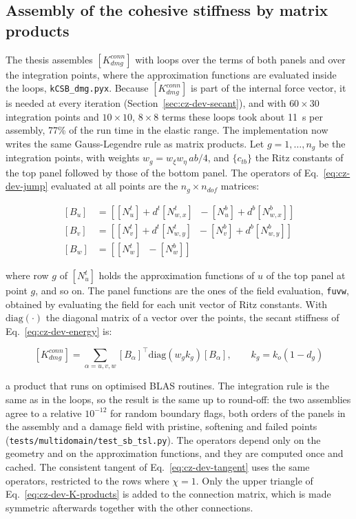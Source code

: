 \subsection{Assembly of the cohesive stiffness by matrix products}\label{sec:cz-dev-assembly}

The thesis assembles $[K^{conn}_{dmg}]$ with loops over the terms of both panels and over the integration points, where the approximation functions are evaluated inside the loops, \texttt{kCSB\_dmg.pyx}. Because $[K^{conn}_{dmg}]$ is part of the internal force vector, it is needed at every iteration (Section~\ref{sec:cz-dev-secant}), and with $60 \times 30$ integration points and $10 \times 10$, $8 \times 8$ terms these loops took about 11~s per assembly, 77\% of the run time in the elastic range. The implementation now writes the same Gauss-Legendre rule as matrix products. Let $g = 1, \dots, n_g$ be the integration points, with weights $w_g = w_{\xi} w_{\eta} \, ab/4$, and $\{c_{tb}\}$ the Ritz constants of the top panel followed by those of the bottom panel. The operators of Eq.~\ref{eq:cz-dev-jump} evaluated at all points are the $n_g \times n_{dof}$ matrices:

\begin{equation}\label{eq:cz-dev-operators}
	\begin{aligned}
		{}[B_u] &= \left[ [N^t_u] + d^t [N^t_{w,x}] \;\; -[N^b_u] + d^b [N^b_{w,x}] \right] \\
		[B_v] &= \left[ [N^t_v] + d^t [N^t_{w,y}] \;\; -[N^b_v] + d^b [N^b_{w,y}] \right] \\
		[B_w] &= \left[ [N^t_w] \;\; -[N^b_w] \right]
	\end{aligned}
\end{equation}

\noindent where row $g$ of $[N^t_u]$ holds the approximation functions of $u$ of the top panel at point $g$, and so on. The panel functions are the ones of the field evaluation, \texttt{fuvw}, obtained by evaluating the field for each unit vector of Ritz constants. With $\text{diag}(\cdot)$ the diagonal matrix of a vector over the points, the secant stiffness of Eq.~\ref{eq:cz-dev-energy} is:

\begin{equation}\label{eq:cz-dev-K-products}
	[K^{conn}_{dmg}] = \sum_{\alpha = u, v, w} [B_\alpha]^\top \text{diag}\left( w_g k_g \right) [B_\alpha], \qquad k_g = k_o (1 - d_g)
\end{equation}

\noindent a product that runs on optimised BLAS routines. The integration rule is the same as in the loops, so the result is the same up to round-off: the two assemblies agree to a relative $10^{-12}$ for random boundary flags, both orders of the panels in the assembly and a damage field with pristine, softening and failed points (\texttt{tests/multidomain/test\_sb\_tsl.py}). The operators depend only on the geometry and on the approximation functions, and they are computed once and cached. The consistent tangent of Eq.~\ref{eq:cz-dev-tangent} uses the same operators, restricted to the rows where $\chi = 1$. Only the upper triangle of Eq.~\ref{eq:cz-dev-K-products} is added to the connection matrix, which is made symmetric afterwards together with the other connections.

